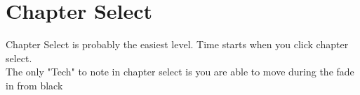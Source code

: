 \section{Chapter Select}

Chapter Select is probably the easiest level. Time starts when you click chapter select.\\
The only "Tech" to note in chapter select is you are able to move during the fade in from black 